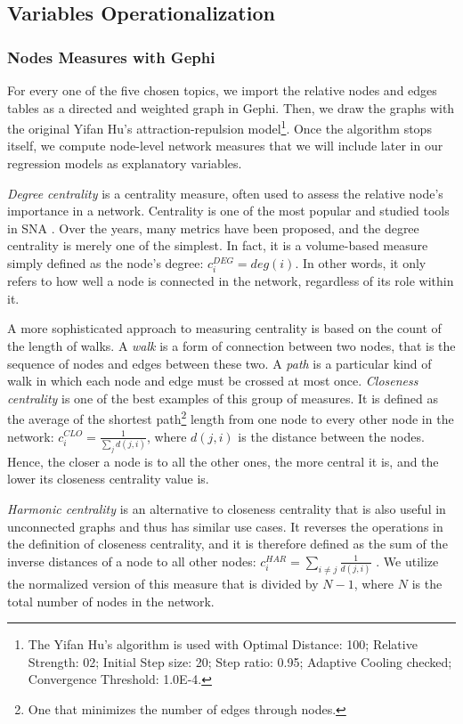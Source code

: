 \subsection{Variables Operationalization}\label{variables-operationalization}
\subsubsection{Nodes Measures with Gephi}
For every one of the five chosen topics, we import the relative nodes and edges tables as a directed and weighted graph in Gephi. Then, we draw the graphs with the original Yifan Hu's attraction-repulsion model\footnote{The Yifan Hu's algorithm is used with Optimal Distance: 100; Relative Strength: 02; Initial Step size: 20; Step ratio: 0.95; Adaptive Cooling checked; Convergence Threshold: 1.0E-4.}\citep{hu:2005}. Once the algorithm stops itself, we compute node-level network measures that we will include later in our regression models as explanatory variables.

\textit{Degree centrality} is a centrality measure, often used to assess the relative node's importance in a network. Centrality is one of the most popular and studied tools in SNA \citep[e.g.,][]{freeman:1978}. Over the years, many metrics have been proposed, and the degree centrality is merely one of the simplest. In fact, it is a volume-based measure simply defined as the node's degree: $c^{DEG}_{i} = deg(i)$. In other words, it only refers to how well a node is connected in the network, regardless of its role within it.


A more sophisticated approach to measuring centrality is based on the count of the length of walks. A \textit{walk} is a form of connection between two nodes, that is the sequence of nodes and edges between these two. A \textit{path} is a particular kind of walk in which each node and edge must be crossed at most once. \textit{Closeness centrality} is one of the best examples of this group of measures. It is defined as the average of the shortest path\footnote{One that minimizes the number of edges through nodes.} length from one node to every other node in the network: $c^{CLO}_{i} = \frac{1}{\sum_{j} d(j,i)}$, where $d(j,i)$ is the distance between the nodes. Hence, the closer a node is to all the other ones, the more central it is, and the lower its closeness centrality value is.

\textit{Harmonic centrality} is an alternative to closeness centrality that is also useful in unconnected graphs and thus has similar use cases. It reverses the operations in the definition of closeness centrality, and it is therefore defined as the sum of the inverse distances of a node to all other nodes: $c^{HAR}_{i} = \sum_{i \ne j}\frac{1}{d(j,i)}$ . We utilize the normalized version of this measure that is divided by $N-1$, where $N$ is the total number of nodes in the network.

